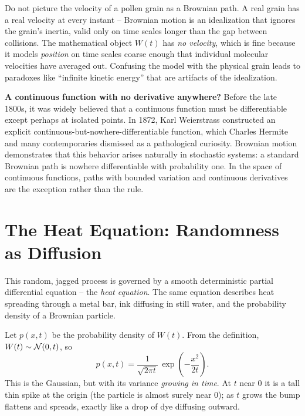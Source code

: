 \begin{trapbox}
Do not picture the velocity of a pollen grain as a Brownian path. A real grain has
a real velocity at every instant -- Brownian motion is an idealization that
ignores the grain's inertia, valid only on time scales longer than the gap
between collisions. The mathematical object $W(t)$ has \emph{no velocity}, which
is fine because it models \emph{position} on time scales coarse enough that
individual molecular velocities have averaged out. Confusing the model with the physical grain leads
to paradoxes like ``infinite kinetic energy'' that are artifacts of the
idealization.
\end{trapbox}

\begin{paradoxbox}
\textbf{A continuous function with no derivative anywhere?} Before the late
1800s, it was widely believed that a continuous function must be
differentiable except perhaps at isolated points. In 1872, Karl
Weierstrass constructed an explicit continuous-but-nowhere-differentiable function,
which Charles Hermite and many contemporaries dismissed as a pathological curiosity. Brownian motion demonstrates that this behavior arises naturally in stochastic systems:
a standard Brownian path is nowhere differentiable with probability one. In the space of continuous functions,
paths with bounded variation and continuous derivatives are the exception rather than the rule.
\end{paradoxbox}

\section{The Heat Equation: Randomness as Diffusion}
\label{ch29:heat}

This random, jagged process is governed by a smooth
deterministic partial differential equation -- the \emph{heat equation}. The same
equation describes heat spreading through a
metal bar, ink diffusing in still water, and the probability density of a
Brownian particle.

Let $p(x,t)$ be the probability density of $W(t)$. From the definition,
$W(t)\sim\mathcal{N}(0,t)$, so
\[
  p(x,t) = \frac{1}{\sqrt{2\pi t}}\,\exp\!\left(-\frac{x^2}{2t}\right).
\]
This is the Gaussian, but with its variance \emph{growing in time}. At $t$ near
$0$ it is a tall thin spike at the origin (the particle is almost surely near
$0$); as $t$ grows the bump flattens and spreads, exactly like a drop of dye
diffusing outward.

